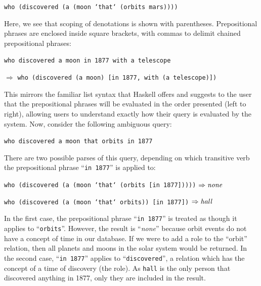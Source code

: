 \documentclass[../main.tex]{subfiles}
\begin{document}
\begin{refsection}
\examplespacing

\texttt{who (discovered (a (moon `that` (orbits mars))))}

\examplespacing

\noindent Here, we see that scoping of denotations is shown with parentheses.  Prepositional phrases are enclosed inside square brackets, with commas to delimit chained prepositional phrases:

\examplespacing

\texttt{who discovered a moon in 1877 with a telescope}

\qquad $\Rightarrow$ \texttt{who (discovered (a moon) [in 1877, with (a telescope)])}

\examplespacing

\noindent This mirrors the familiar list syntax that Haskell offers and suggests to the user that the prepositional phrases will be evaluated in the order presented (left to right), allowing users to understand exactly how their query is evaluated by the system. Now, consider the following ambiguous query:

\examplespacing

\texttt{who discovered a moon that orbits in 1877}

\examplespacing

\noindent There are two possible parses of this query, depending on which transitive verb the prepositional phrase ``\texttt{in 1877}'' is applied to:

\examplespacing

\texttt{who (discovered (a (moon `that` (orbits [in 1877]))))} $\Rightarrow \operatorname{\mathit{none}}$

\texttt{who (discovered (a (moon `that` orbits)) [in 1877])} $\Rightarrow  \operatorname{\mathit{hall}}$

\examplespacing

\noindent In the first case, the prepositional phrase ``\texttt{in 1877}'' is treated as though it applies to ``\texttt{orbits}''.  However, the result is ``\textit{none}'' because orbit events do not have a concept of time in our database.  If we were to add a  role to the ``orbit'' relation, then all planets and moons in the solar system would be returned.
In the second case, ``\texttt{in 1877}'' applies to ``\texttt{discovered}'', a relation which has the concept of a time of discovery (the  role).  As \texttt{hall} is the only person that discovered anything in 1877, only they are included in the result.


\end{refsection}
\end{document}
